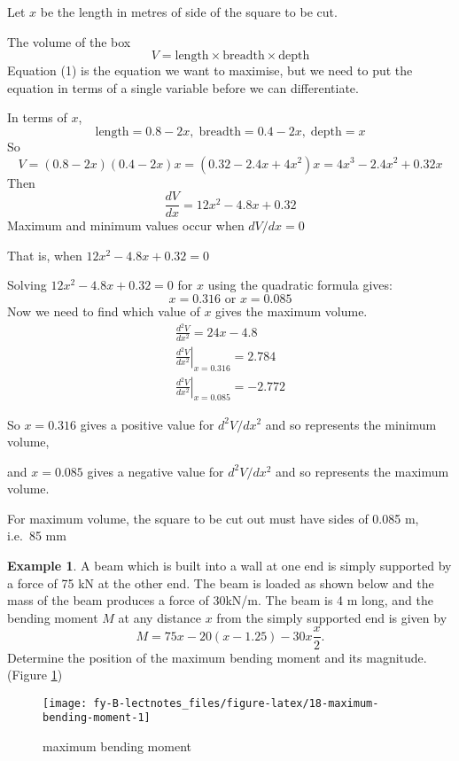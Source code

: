 \documentclass[
  11pt,
  oneside]{book}
\newcommand{\slide}{}
\theoremstyle{definition}
\theoremstyle{definition}
\newtheorem{example}{Example}[chapter]
\theoremstyle{definition}
\theoremstyle{definition}
\theoremstyle{remark}
\begin{document}
Let \(x\) be the length in metres of side of the square to be cut.

The volume of the box
\[
V = \text{length}\times\text{breadth}\times\text{depth}\tag{1}
\]
Equation (1) is the equation we want to maximise, but we need to put the equation in terms of a single variable before we can differentiate.

In terms of \(x\),
\[
\text{length} = 0.8 - 2x,\; \text{breadth} = 0.4 - 2x,\;\text{depth} = x
\]
So
\[
V = (0.8 - 2x)(0.4 - 2x)x = (0.32 - 2.4x + 4x^2)x = 4x^3 - 2.4x^2 + 0.32x
\]
Then
\[
\frac{dV}{dx} = 12x^2 - 4.8x + 0.32
\]
Maximum and minimum values occur when \(dV/dx  = 0\)

That is, when \(12x^2 - 4.8x + 0.32= 0\)

Solving \(12x^2 - 4.8x + 0.32= 0\) for \(x\) using the quadratic formula gives:
\[
 x = 0.316\text{ or }x = 0.085
\]
Now we need to find which value of \(x\) gives the maximum volume.
\begin{gather*}
\frac{d^2V}{dx^2}= 24x - 4.8\\
\left.\frac{d^2V}{dx^2}\right\vert_{x=0.316} = 2.784\\
\left.\frac{d^2V}{dx^2}\right\vert_{x=0.085} = -2.772
\end{gather*}

\slide

So \(x=0.316\) gives a positive value for \(d^2V/dx^2\) and so represents the minimum volume,

and \(x=0.085\) gives a negative value for \(d^2V/dx^2\) and so represents the maximum volume.

For maximum volume, the square to be cut out must have sides of 0.085 m, i.e.~85 mm
\slide

\begin{example}
A beam which is built into a wall at one end is simply supported by a force of 75 kN at the other end. The beam is loaded as shown below and the mass of the beam produces a force of 30kN/m. The beam is 4 m long, and the bending moment \(M\) at any distance \(x\) from the simply supported end is given by
\[
M = 75x-20(x-1.25)-30x\frac{x}{2}.
\]
Determine the position of the maximum bending moment and its magnitude. (Figure \ref{fig:18-maximum-bending-moment})
\end{example}

\begin{figure}

{\centering \texttt{[image: fy-B-lectnotes\_files/figure-latex/18-maximum-bending-moment-1]} 

}

\caption{maximum bending moment}\label{fig:18-maximum-bending-moment}
\end{figure}
\end{document}

